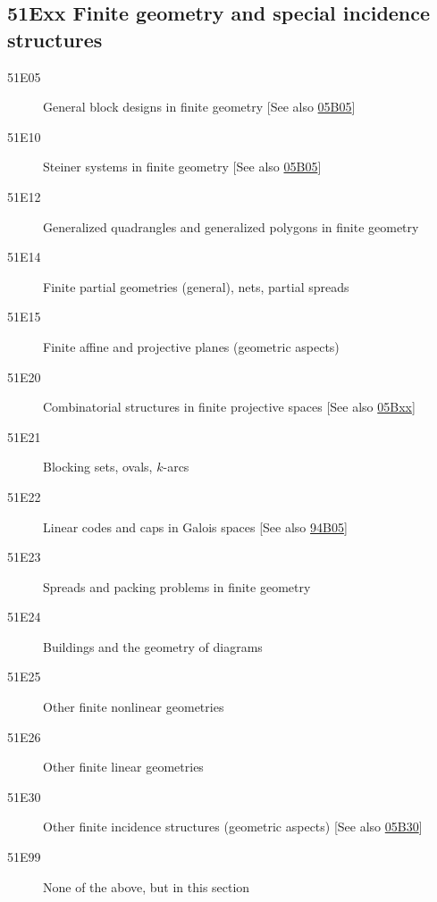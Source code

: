 \subsection*{51Exx  Finite geometry and special incidence structures }\label{51Exx}
\begin{description}  
\item [51E05]\label{51E05} General block designs in finite geometry [See also \hyperref[05B05]{05B05}]
\item [51E10]\label{51E10} Steiner systems in finite geometry [See also \hyperref[05B05]{05B05}]
\item [51E12]\label{51E12} Generalized quadrangles and generalized polygons in finite geometry
\item [51E14]\label{51E14} Finite partial geometries (general), nets, partial spreads
\item [51E15]\label{51E15} Finite affine and projective planes (geometric aspects)
\item [51E20]\label{51E20} Combinatorial structures in finite projective spaces [See also \hyperref[05Bxx]{05Bxx}]
\item [51E21]\label{51E21} Blocking sets, ovals, $k$-arcs
\item [51E22]\label{51E22} Linear codes and caps in Galois spaces [See also \hyperref[94B05]{94B05}]
\item [51E23]\label{51E23} Spreads and packing problems in finite geometry
\item [51E24]\label{51E24} Buildings and the geometry of diagrams
\item [51E25]\label{51E25} Other finite nonlinear geometries
\item [51E26]\label{51E26} Other finite linear geometries
\item [51E30]\label{51E30} Other finite incidence structures (geometric aspects) [See also \hyperref[05B30]{05B30}]
\item [51E99]\label{51E99} None of the above, but in this section
\end{description}
